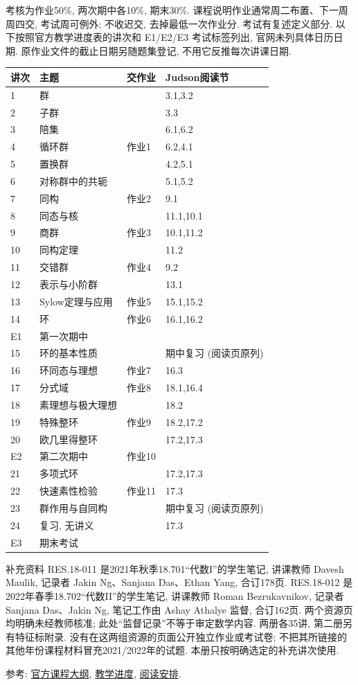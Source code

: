 考核为作业50\%, 两次期中各10\%, 期末30\%. 课程说明作业通常周二布置、下一周周四交, 考试周可例外; 不收迟交, 去掉最低一次作业分. 考试有复述定义部分. 以下按照官方教学进度表的讲次和 E1/E2/E3 考试标签列出, 官网未列具体日历日期. 原作业文件的截止日期另随题集登记, 不用它反推每次讲课日期.
\begin{longtable}{@{}p{}p{}p{}p{}@{}}
\toprule 讲次&主题&交作业&Judson阅读节\\\midrule\endhead
1&群&&3.1,3.2\\
2&子群&&3.3\\
3&陪集&&6.1,6.2\\
4&循环群&作业1&6.2,4.1\\
5&置换群&&4.2,5.1\\
6&对称群中的共轭&&5.1,5.2\\
7&同构&作业2&9.1\\
8&同态与核&&11.1,10.1\\
9&商群&作业3&10.1,11.2\\
10&同构定理&&11.2\\
11&交错群&作业4&9.2\\
12&表示与小阶群&&13.1\\
13&Sylow定理与应用&作业5&15.1,15.2\\
14&环&作业6&16.1,16.2\\
E1&第一次期中&&\\
15&环的基本性质&&期中复习 (阅读页原列)\\
16&环同态与理想&作业7&16.3\\
17&分式域&作业8&18.1,16.4\\
18&素理想与极大理想&&18.2\\
19&特殊整环&作业9&18.2,17.2\\
20&欧几里得整环&&17.2,17.3\\
E2&第二次期中&作业10&\\
21&多项式环&&17.2,17.3\\
22&快速素性检验&作业11&17.3\\
23&群作用与自同构&&期中复习 (阅读页原列)\\
24&复习, 无讲义&&17.3\\
E3&期末考试&&\\
\bottomrule
\end{longtable}
补充资料 RES.18-011 是2021年秋季18.701“代数I”的学生笔记, 讲课教师 Davesh Maulik, 记录者 Jakin Ng、Sanjana Das、Ethan Yang, 合订178页. RES.18-012 是2022年春季18.702“代数II”的学生笔记, 讲课教师 Roman Bezrukavnikov, 记录者 Sanjana Das、Jakin Ng, 笔记工作由 Ashay Athalye 监督, 合订162页. 两个资源页均明确未经教师核准; 此处“监督记录”不等于审定数学内容. 两册各35讲, 第二册另有特征标附录. 没有在这两组资源的页面公开独立作业或考试卷; 不把其所链接的其他年份课程材料冒充2021/2022年的试题. 本册只按明确选定的补充讲次使用.

参考: \href{https://ocw.mit.edu/courses/18-703-modern-algebra-spring-2013/pages/syllabus/}{官方课程大纲}, \href{https://ocw.mit.edu/courses/18-703-modern-algebra-spring-2013/pages/calendar/}{教学进度}, \href{https://ocw.mit.edu/courses/18-703-modern-algebra-spring-2013/pages/readings/}{阅读安排}.
